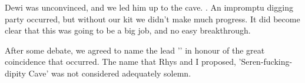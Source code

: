     Dewi was unconvinced, and we led him up to the cave. . An impromptu digging party occurred, but without our kit we didn't make much progress. It did become clear that this was going to be a big job, and no easy breakthrough. 
    
    After some debate, we agreed to name the lead '' in honour of the great coincidence that occurred. The name that Rhys and I proposed, 'Seren-fucking-dipity Cave' was not considered adequately solemn.

    \begin{figure}[t!]
        \checkoddpage \ifoddpage \forcerectofloat \else \forceversofloat \fi
        \centering


\end{figure}
